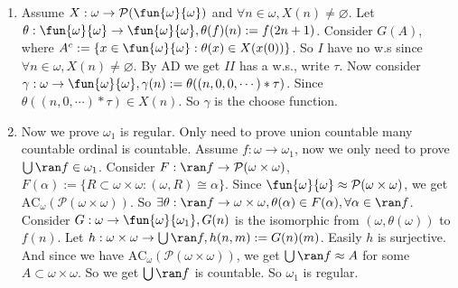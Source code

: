 \documentclass{ctexart}
\begin{document}
\begin{solution}
  \begin{enumerate}
    \item Assume \(X:\omega \to \mathcal{P}(\fun{\omega}{\omega})\) and \(\forall n \in \omega,X(n)\neq \varnothing\). 
  Let \(\theta:\fun{\omega}{\omega}\to \fun{\omega}{\omega},\theta(f)(n):=f(2n+1)\). 
  Consider \(G(A)\), where \(A^c:=\{x \in \fun{\omega}{\omega}:\theta(x) \in X(x(0))\}\). 
  So \(I\) have no w.s since \(\forall n \in \omega,X(n)\neq \varnothing\). 
  By AD we get \(II\) has a w.s., write \(\tau\). 
  Now consider \(\gamma:\omega \to \fun{\omega}{\omega},\gamma(n):=\theta((n,0,0,\cdots)*\tau)\). 
  Since \(\theta((n,0,\cdots)*\tau) \in X(n)\). So \(\gamma\) is the choose function. 
  
    \item Now we prove \(\omega_1\) is regular. Only need to prove union countable many countable ordinal is countable. 
      Assume \(f: \omega \to \omega_1\), now we only need to prove \( \bigcup \ran f \in \omega_1\). 
      Consider \(F:\ran f \to \mathcal{P}(\omega \times \omega)\), \(F(\alpha):=\{R \subset \omega \times \omega:(\omega,R)\cong \alpha\}\). 
      Since \(\fun{\omega}{\omega}\approx \mathcal{P}(\omega \times \omega)\), we get \(\text{AC}_\omega(\mathcal{P}(\omega \times \omega))\). 
  So \(\exists \theta:\ran f \to \omega \times \omega,\theta(\alpha) \in F(\alpha),\forall \alpha \in \ran f\). 
  Consider \(G:\omega \to \fun{\omega}{\omega_1},G(n)\) is the isomorphic from \((\omega,\theta(\omega))\) to \(f(n)\). 
  Let \(h:\omega \times \omega \to \bigcup \ran f,h(n,m):=G(n)(m) \). Easily \(h\) is surjective. 
  And since we have \(\text{AC}_\omega(\mathcal{P}(\omega \times \omega))\), we get \(\bigcup \ran f \approx A \) for some \(A \subset \omega \times \omega\). 
  So we get \(\bigcup \ran f \) is countable. So \(\omega_1\) is regular. 
   
  \end{enumerate}
\end{solution}
\end{document}
